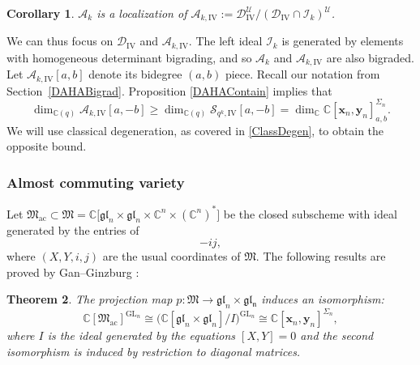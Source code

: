 \documentclass[11pt]{article}
\newcommand{\GL}{\mathrm{GL}}
\newtheorem{thm}{Theorem}[section]
\newtheorem{cor}[thm]{Corollary}
\theoremstyle{definition}
\newcommand{\CC}{\mathbb{C}}
\newcommand{\UU}{\mathcal{U}}
\newcommand{\DD}{\mathcal{D}}
\newcommand{\AAA}{\mathcal{A}}
\begin{document}
\begin{cor}\label{ALocCor}
$\AAA_k$ is a localization of $\AAA_{k,\mathrm{IV}}:=\DD_{\mathrm{IV}}^\UU\big/(\DD_{\mathrm{IV}}\cap\mathcal{I}_k)^\UU$.
\end{cor}

We can thus focus on $\mathcal{D}_{\mathrm{IV}}$ and $\AAA_{k,\mathrm{IV}}$.
The left ideal $\mathcal{I}_k$ is generated by elements with homogeneous determinant bigrading, and so $\AAA_k$ and $\AAA_{k,\mathrm{IV}}$ are also bigraded.
Let $\AAA_{k,\mathrm{IV}}[a,b]$ denote its bidegree $(a,b)$ piece.
Recall our notation from Section~\ref{DAHABigrad}.
Proposition \ref{DAHAContain} implies that
\begin{equation}
\dim_{\CC(q)}\AAA_{k,\mathrm{IV}}[a,-b]\ge\dim_{\CC(q)}\mathcal{S}_{q^k,\mathrm{IV}}[a,-b]=\dim_\CC\CC\left[ \boldsymbol{x}_n,\boldsymbol{y}_n \right]^{\Sigma_n}_{a,b}.
\label{ABig}
\end{equation}
We will use classical degeneration, as covered in \ref{ClassDegen}, to obtain the opposite bound.

\subsubsection{Almost commuting variety}
Let $\mathfrak{M}_{\mathrm{ac}}\subset\mathfrak{M}=\CC\bigl[\mathfrak{gl}_n\times\mathfrak{gl}_n\times\CC^n\times(\CC^n)^*\bigr]$ be the closed subscheme with ideal generated by the entries of
\begin{equation}
[X,Y]-ij,
\label{ACEquation}
\end{equation}
where $(X,Y,i,j)$ are the usual coordinates of $\mathfrak{M}$.
The following results are proved by Gan--Ginzburg \cite{GanGinz}:
\begin{thm}
The projection map $p:\mathfrak{M}\to\mathfrak{gl}_n\times\mathfrak{gl_n}$ induces an isomorphism:
\begin{equation}
\CC[\mathfrak{M}_{\mathrm{ac}}]^{\GL_n}\cong\bigl(\CC[\mathfrak{gl}_n\times\mathfrak{gl}_n]\big/I\bigr)^{\GL_n}
\cong \CC[\boldsymbol{x}_n,\boldsymbol{y}_n]^{\Sigma_n},
\label{ACIso}
\end{equation}
where $I$ is the ideal generated by the equations $[X,Y]=0$ and the second isomorphism is induced by restriction to diagonal matrices.
\end{thm}
\end{document}
